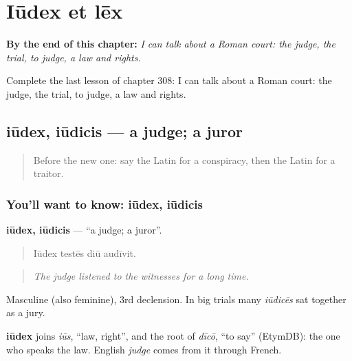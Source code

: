 
\chapter{Iūdex et lēx}
\label{ch:la-iudex-et-lex}

\begin{chapteropening}
\textbf{By the end of this chapter:} \emph{I can talk about a Roman court: the judge, the trial, to judge, a law and rights.}

Complete the last lesson of chapter 308: I can talk about a Roman court: the judge, the trial, to judge, a law and rights.
\end{chapteropening}

\section[iūdex, iūdicis]{iūdex, iūdicis — a judge; a juror}

\label{lesson:LA-C308-iudex}



\begin{quote}
Before the new one: say the Latin for a conspiracy, then the Latin for a traitor.
\end{quote}

\subsection*{You'll want to know: iūdex, iūdicis}
\textbf{iūdex, iūdicis} — \textquotedblleft{}a judge; a juror\textquotedblright{}.

\begin{quote}
Iūdex testēs diū audīvit.
\end{quote}

\begin{quote}
\emph{The judge listened to the witnesses for a long time.}
\end{quote}

Masculine (also feminine), 3rd declension. In big trials many \emph{iūdicēs} sat together as a jury.

\begin{cousinweb}
\textbf{iūdex} joins \emph{iūs}, \textquotedblleft{}law, right\textquotedblright{}, and the root of \emph{dīcō}, \textquotedblleft{}to say\textquotedblright{} (EtymDB): the one who speaks the law. English \emph{judge} comes from it through French.
\end{cousinweb}

